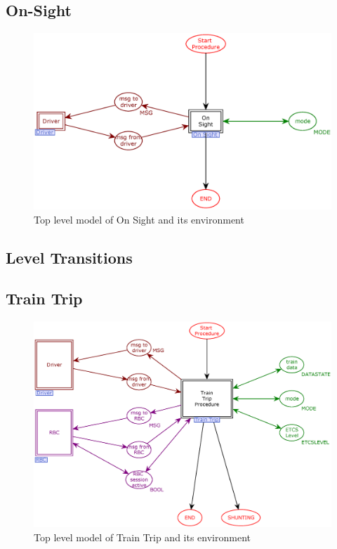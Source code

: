 \documentclass{template/openetcs_article}
\begin{document}
\subsection{On-Sight}
\begin{figure}[htb] 
  \centering
  \includegraphics[scale=0.5]{OnSight-toplevel.eps}
  \caption{Top level model of On Sight and its environment}
  \label{fig:On Sight-toplevel}
\end{figure}

\subsection{Level Transitions}

\subsection{Train Trip}

\begin{figure}[htb] 
  \centering
  \includegraphics[scale=0.5]{Train_Trip-toplevel.eps}
  \caption{Top level model of Train Trip and its environment}
  \label{fig:Trip-toplevel}
\end{figure}
\end{document}
